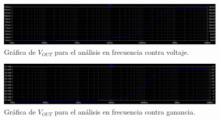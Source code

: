 \documentclass[letterpaper,12pt]{article}
\begin{document}
\begin{figure}[H]
	\centering
	\includegraphics[scale=0.6]{SimFrecuenciaGraficaVoltaje}
	\caption{Gráfica de $V_{OUT}$ para el análisis en frecuencia contra voltaje.}
	\label{CFrecuenciaV}
\end{figure}
\begin{figure}[H]
	\centering
	\includegraphics[scale=0.6]{SimFrecuenciaGraficaBode}
	\caption{Gráfica de $V_{OUT}$ para el análisis en frecuencia contra ganancia.}
	\label{CFrecuenciaB}
\end{figure}
\end{document}
